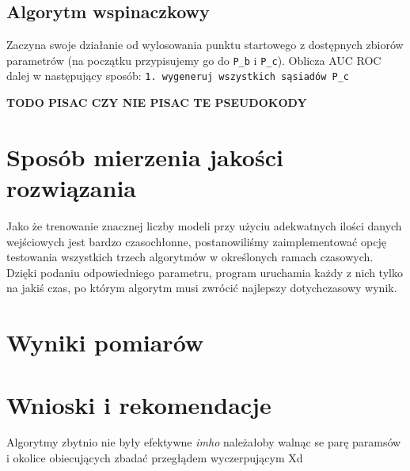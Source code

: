 \documentclass[11pt]{article}
\begin{document}
\subsection{Algorytm wspinaczkowy}
Zaczyna swoje działanie od wylosowania punktu startowego z dostępnych zbiorów parametrów (na początku przypisujemy go do \texttt{P\_b} i \texttt{P\_c}). Oblicza AUC ROC dalej w następujący sposób:
\texttt{1. wygeneruj wszystkich sąsiadów P\_c}
    
\textbf{TODO PISAC CZY NIE PISAC TE PSEUDOKODY}                   






\section{Sposób mierzenia jakości rozwiązania}
Jako że trenowanie znacznej liczby modeli przy użyciu adekwatnych ilości danych wejściowych jest bardzo czasochłonne, postanowiliśmy zaimplementować opcję testowania wszystkich trzech algorytmów w określonych ramach czasowych. Dzięki podaniu odpowiedniego parametru, program uruchamia każdy z nich tylko na jakiś czas, po którym algorytm musi zwrócić najlepszy dotychczasowy wynik.

\section{Wyniki pomiarów}



\section{Wnioski i rekomendacje}
Algorytmy zbytnio nie były efektywne \textit{imho} należałoby walnąc se parę paramsów i okolice obiecujących zbadać przegłądem wyczerpującym Xd
\end{document}
